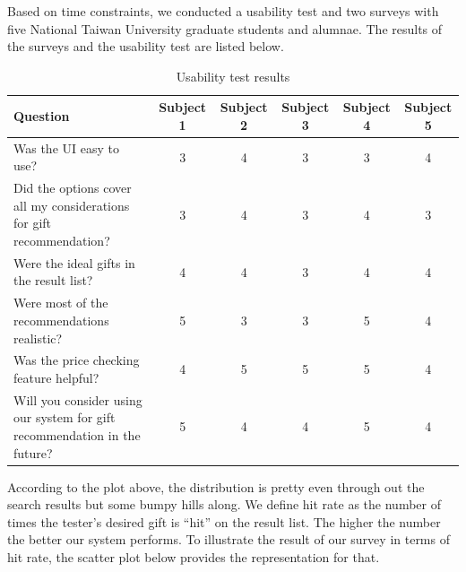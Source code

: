 \documentclass[11pt,twocolumn]{article}
\begin{document}
Based on time constraints, we conducted a usability test and two surveys with five National Taiwan University graduate students and alumnae.
The results of the surveys and the usability test are listed below.

\begin{table}[ht]
\caption{Usability test results}
\centering
\begin{tabular}{| p{5cm} | c | c | c | c | c |}
\hline
Question & Subject 1 & Subject 2 & Subject 3 & Subject 4 & Subject 5 \\
\hline
Was the UI easy to use? & 3 & 4 & 3 & 3 & 4 \\
\hline
Did the options cover all my considerations for gift recommendation? & 3 & 4 & 3 & 4 & 3 \\
\hline
Were the ideal gifts in the result list? & 4 & 4 & 3 & 4 & 4 \\
\hline
Were most of the recommendations realistic? & 5 & 3 & 3 & 5 & 4 \\
\hline
Was the price checking feature helpful? & 4 & 5 & 5 & 5 & 4 \\
\hline
Will you consider using our system for gift recommendation in the future? & 5 & 4 & 4 & 5 & 4 \\
\hline
\end{tabular}
\label{table:usetest}
\end{table}


According to the plot above, the distribution is pretty even through out the search results but some bumpy hills along. We define hit rate as the number of times the tester's desired gift is ``hit'' on the result list. The higher the number the better our system performs. To illustrate the result of our survey in terms of hit rate, the scatter plot below provides the representation for that.
\end{document}
